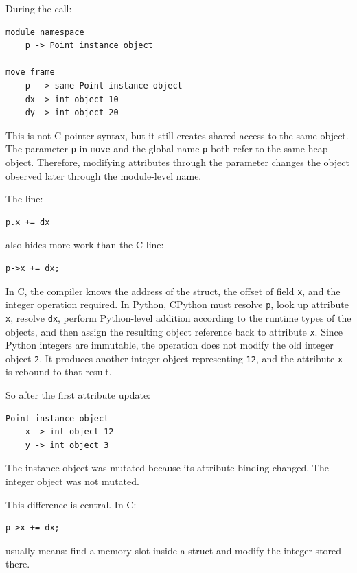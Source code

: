 During the call:

\begin{verbatim}
module namespace
    p -> Point instance object

move frame
    p  -> same Point instance object
    dx -> int object 10
    dy -> int object 20
\end{verbatim}

This is not C pointer syntax, but it still creates shared access to the same object. The parameter \texttt{p} in \texttt{move} and the global name \texttt{p} both refer to the same heap object. Therefore, modifying attributes through the parameter changes the object observed later through the module-level name.

The line:

\begin{verbatim}
p.x += dx
\end{verbatim}

also hides more work than the C line:

\begin{verbatim}
p->x += dx;
\end{verbatim}

In C, the compiler knows the address of the struct, the offset of field \texttt{x}, and the integer operation required. In Python, CPython must resolve \texttt{p}, look up attribute \texttt{x}, resolve \texttt{dx}, perform Python-level addition according to the runtime types of the objects, and then assign the resulting object reference back to attribute \texttt{x}. Since Python integers are immutable, the operation does not modify the old integer object \texttt{2}. It produces another integer object representing \texttt{12}, and the attribute \texttt{x} is rebound to that result.

So after the first attribute update:

\begin{verbatim}
Point instance object
    x -> int object 12
    y -> int object 3
\end{verbatim}

The instance object was mutated because its attribute binding changed. The integer object was not mutated.

This difference is central. In C:

\begin{verbatim}
p->x += dx;
\end{verbatim}

usually means: find a memory slot inside a struct and modify the integer stored there.


